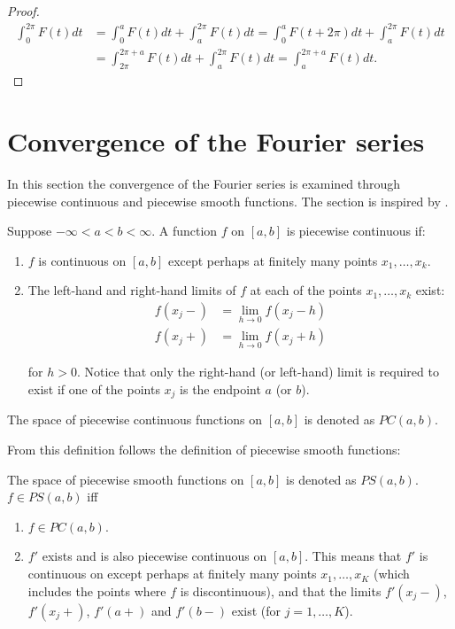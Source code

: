 \begin{proof}
\begin{align*}
	\int_0^{2\pi} F(t)dt 
	&= \int_0^a F(t) dt + \int_a^{2\pi} F(t) dt
	= \int_0^a F(t+2\pi)dt + \int_a^{2\pi} F(t) dt\\ 
	&= \int_{2\pi}^{2\pi + a} F(t) dt + \int_a^{2\pi}F(t)dt
	= \int_a^{2\pi+a}F(t)dt.
\end{align*}
\end{proof}

\section{Convergence of the Fourier series}
In this section the convergence of the Fourier series is examined through piecewise continuous and piecewise smooth functions. The section is inspired by \cite{page 31-36, FAA}.

\begin{definition}
Suppose $-\infty < a < b < \infty$. A function $f$ on $[a,b]$ is piecewise continuous if:
\begin{enumerate}
\item $f$ is continuous on $[a,b]$ except perhaps at finitely many points $x_1, \dots, x_k$.
\item The left-hand and right-hand limits of $f$ at each of the points $x_1, \dots, x_k$ exist:
\begin{align*}
f(x_j-) &= \lim_{h\to 0} f(x_j - h) \\
f(x_j+) &= \lim_{h\to 0} f(x_j + h)
\end{align*}

for $h > 0$. Notice that only the right-hand (or left-hand) limit is required to exist if one of the points $x_j$ is the endpoint $a$ (or $b$).
\end{enumerate}

The space of piecewise continuous functions on $[a,b]$ is denoted as $PC(a,b)$.
\end{definition}

From this definition follows the definition of piecewise smooth functions:
\begin{definition}
The space of piecewise smooth functions on $[a,b]$ is denoted as $PS(a,b)$. $f\in PS(a,b)$ iff
\begin{enumerate}
	\item $f \in PC(a,b)$.
	\item $f'$ exists and is also piecewise continuous on $[a,b]$. This means that $f'$ is continuous on except perhaps at finitely many points $x_1, \dots, x_K$ (which includes the points where $f$ is discontinuous), and that the limits $f'(x_j-)$, $f'(x_j+)$, $f'(a+)$ and $f'(b-)$ exist (for $j = 1,\dots, K$).
\end{enumerate}
\end{definition}

